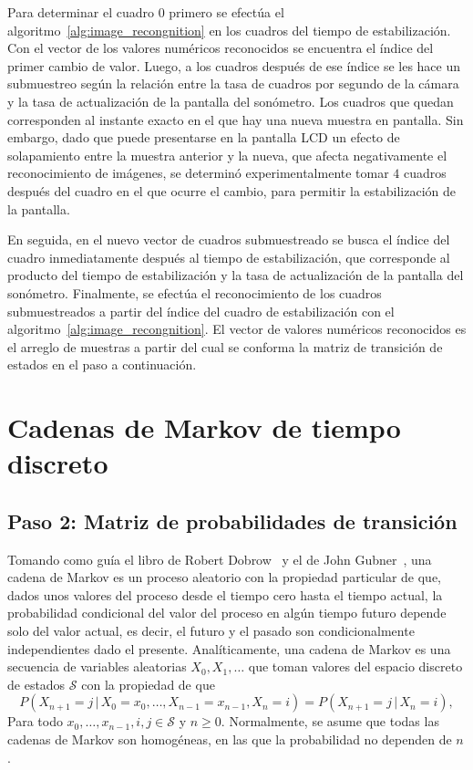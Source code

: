 Para determinar el cuadro $0$ primero se efectúa el algoritmo~\ref{alg:image_recongnition} en los cuadros del tiempo de estabilización.
Con el vector de los valores numéricos reconocidos se encuentra el índice del primer cambio de valor.
Luego, a los cuadros después de ese índice se les hace un submuestreo según la relación entre la tasa de cuadros por segundo de la cámara y la tasa de actualización de la pantalla del sonómetro.
Los cuadros que quedan corresponden al instante exacto en el que hay una nueva muestra en pantalla.
Sin embargo, dado que puede presentarse en la pantalla LCD un efecto de solapamiento entre la muestra anterior y la nueva, que afecta negativamente el reconocimiento de imágenes, se determinó experimentalmente tomar $4$ cuadros después del cuadro en el que ocurre el cambio, para permitir la estabilización de la pantalla.

En seguida, en el nuevo vector de cuadros submuestreado se busca el índice del cuadro inmediatamente después al tiempo de estabilización, que corresponde al producto del tiempo de estabilización y la tasa de actualización de la pantalla del sonómetro.
Finalmente, se efectúa el reconocimiento de los cuadros submuestreados a partir del índice del cuadro de estabilización con el algoritmo~\ref{alg:image_recongnition}.
El vector de valores numéricos reconocidos es el arreglo de muestras a partir del cual se conforma la matriz de transición de estados en el paso a continuación.


\section{Cadenas de Markov de tiempo discreto}

\subsection*{Paso 2: Matriz de probabilidades de transición}
\label{subsec:transition_matrix}
Tomando como guía el libro de Robert Dobrow~\citeyearpar{Dobrow2016} y el de John Gubner~\citeyearpar{Gubner2006}, una cadena de Markov es un proceso aleatorio con la propiedad particular de que, dados unos valores del proceso desde el tiempo cero hasta el tiempo actual, la probabilidad condicional del valor del proceso en algún tiempo futuro depende solo del valor actual, es decir, el futuro y el pasado son condicionalmente independientes dado el presente.
Analíticamente, una cadena de Markov es una secuencia de variables aleatorias $X_0, X_1, \dots$ que toman valores del espacio discreto de estados $\mathcal{S}$ con la propiedad de que
%
\begin{equation}
    \label{eq:markov_chain}
    P\left(X_{n + 1} = j\,|\,X_0 = x_0, \dots, X_{n - 1}
    = x_{n - 1}, X_n = i\right) = P\left(X_{n + 1} = j\,|\,X_n = i\right),
\end{equation}
%
Para todo $x_0, \dots, x_{n - 1}, i, j \in \mathcal{S}$ y $n \ge 0$.
Normalmente, se asume que todas las cadenas de Markov son homogéneas, en las que la probabilidad no dependen de $n$.

